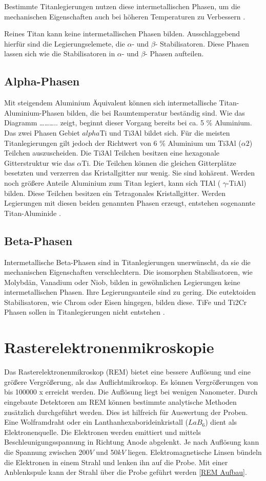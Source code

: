 \documentclass[a4paper, 11pt]{tubsreprt}
\begin{document}
Bestimmte Titanlegierungen nutzen diese intermetallischen Phasen, um die mechanischen Eigenschaften auch bei höheren Temperaturen zu Verbessern \cite{Luetjering2007}.

Reines Titan kann keine intermetallischen Phasen bilden. Ausschlaggebend hierfür sind die Legierungselemete, die $\alpha$- und $\beta$- Stabilisatoren.  Diese Phasen lassen sich wie die Stabilisatoren  in $\alpha$- und $\beta$- Phasen aufteilen.  
\subsection{Alpha-Phasen}
Mit steigendem Aluminium Äquivalent können sich intermetallische Titan-Aluminium-Phasen bilden, die bei Raumtemperatur beständig sind. Wie das Diagramm ……….. zeigt, beginnt dieser Vorgang bereits bei ca. 5 \% Aluminium. Das zwei Phasen Gebiet $alpha$Ti und Ti3Al bildet sich. Für die meisten Titanlegierungen gilt jedoch der Richtwert von 6 \% Aluminium um Ti3Al ($\alpha2$) Teilchen auszuscheiden.  Die Ti3Al Teilchen besitzen eine hexagonale Gitterstruktur wie das $\alpha$Ti. Die Teilchen können  die gleichen Gitterplätze besetzten und verzerren das Kristallgitter nur wenig. Sie sind kohärent.
Werden noch größere Anteile Aluminium  zum Titan legiert, kann sich TIAl ( $\gamma$-TiAl) bilden. Diese Teilchen besitzen ein Tetragonales Kristallgitter.
 Werden Legierungen mit diesen beiden genannten Phasen erzeugt, entstehen sogenannte Titan-Aluminide \cite[vgl.]{Luetjering2007}.   

\subsection{Beta-Phasen}
Intermetallische Beta-Phasen sind in Titanlegierungen unerwünscht, da sie die mechanischen Eigenschaften verschlechtern. Die isomorphen Stabilisatoren, wie Molybdän, Vanadium oder Niob, bilden in gewöhnlichen Legierungen keine intermetallischen Phasen. Ihre Legierungsanteile sind zu gering. Die eutektoiden Stabilisatoren, wie Chrom oder Eisen hingegen, bilden diese. TiFe und Ti2Cr Phasen sollen in Titanlegierungen nicht entstehen \cite{Luetjering2007}.

\section{Rasterelektronenmikroskopie}
Das Rasterelektronenmikroskop (REM) bietet eine bessere Auflösung und eine größere Vergrößerung, als das Auflichtmikroskop. Es können Vergrößerungen von bis 100000 x erreicht werden. Die Auflösung liegt bei wenigen Nanometer. Durch eingebaute Detektoren am REM können bestimmte analytische Methoden zusätzlich  durchgeführt werden. Dies ist hilfreich für Auswertung der Proben.
Eine Wolframdraht oder ein Lanthanhexaborideinkristall ($LaB_{6}$) dient als Elektronenquelle. Die Elektronen werden emittiert und mittels Beschleunigungsspannung in Richtung Anode abgelenkt. Je nach Auflösung kann die Spannung zwischen 200$V$ und 50$kV$ liegen. Elektromagnetische Linsen bündeln die Elektronen in einem Strahl und lenken ihn auf die Probe. Mit einer Anblenkspule kann der Strahl über die Probe geführt werden \ref{REM Aufbau}.
\end{document}
